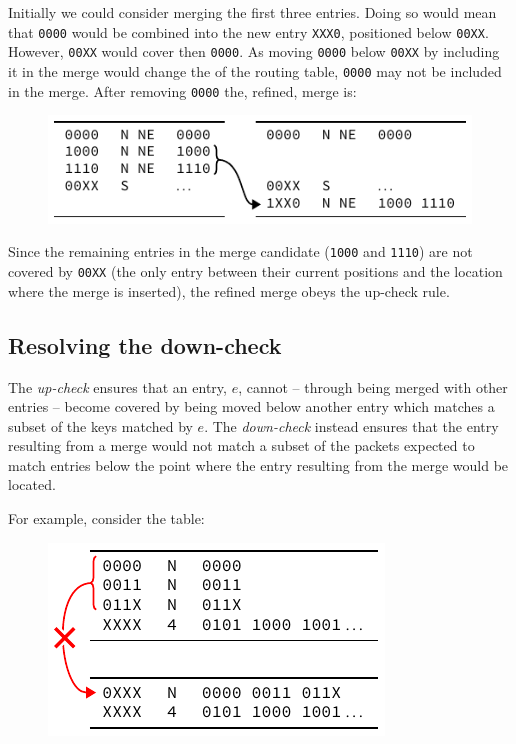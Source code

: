 \documentclass[conference]{IEEEtran}
\newcommand{\mytt}[1]{\texttt{\footnotesize#1}}
\begin{document}
  \noindent Initially we could consider merging the first three entries.
  Doing so would mean that \mytt{0000} would be combined into the new entry \mytt{XXX0}, positioned below \mytt{00XX}.
  However, \mytt{00XX} would cover then \mytt{0000}.
  As moving \mytt{0000} below \mytt{00XX} by including it in the merge would change the  of the routing table, \mytt{0000} may not be included in the merge.
  After removing \mytt{0000} the, refined, merge is:\par\nopagebreak
  \begin{figure}[H]
    \centering
    \includegraphics{figures/upcheck_resolve_example_2}
  \end{figure}

  \noindent Since the remaining entries in the merge candidate (\mytt{1000} and \mytt{1110}) are not covered by \mytt{00XX} (the only entry between their current positions and the location where the merge is inserted), the refined merge obeys the up-check rule.

  \subsection{Resolving the down-check}

  The \textit{up-check} ensures that an entry, $e$, cannot -- through being merged with other entries -- become covered by being moved below another entry which matches a subset of the keys matched by $e$.
  The \textit{down-check} instead ensures that the entry resulting from a merge would not match a subset of the packets expected to match entries below the point where the entry resulting from the merge would be located.
  
  For example, consider the table:\par\nopagebreak
  \begin{figure}[H]
    \centering
    \includegraphics{figures/downcheck_resolve_example_1}
  \end{figure}
\end{document}
